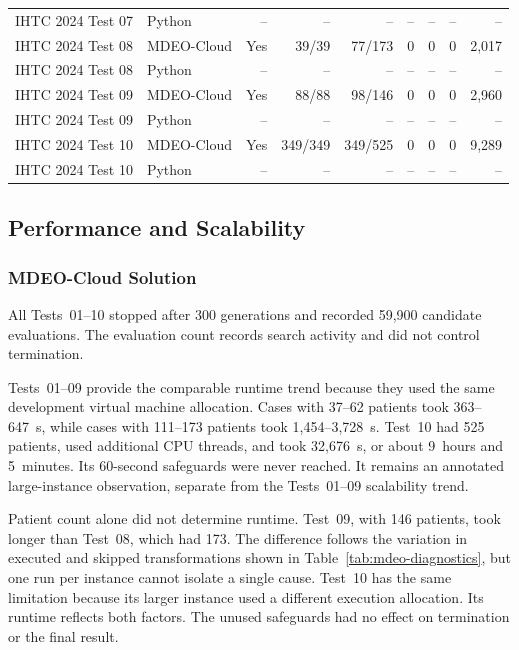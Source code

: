 \documentclass[11pt,a4paper]{article}
\begin{document}
\begin{landscape}
{\begin{longtable}{llrrrrrrr}
IHTC 2024 Test 07 & Python & -- & -- & -- & -- & -- & -- & -- \\
IHTC 2024 Test 08 & MDEO-Cloud & Yes & 39/39 & 77/173 & 0 & 0 & 0 & 2,017 \\
IHTC 2024 Test 08 & Python & -- & -- & -- & -- & -- & -- & -- \\
IHTC 2024 Test 09 & MDEO-Cloud & Yes & 88/88 & 98/146 & 0 & 0 & 0 & 2,960 \\
IHTC 2024 Test 09 & Python & -- & -- & -- & -- & -- & -- & -- \\
IHTC 2024 Test 10 & MDEO-Cloud & Yes & 349/349 & 349/525 & 0 & 0 & 0 & 9,289 \\
IHTC 2024 Test 10 & Python & -- & -- & -- & -- & -- & -- & -- \\
\bottomrule
\end{longtable}
}
\end{landscape}

\subsection{Performance and Scalability}

\subsubsection{MDEO-Cloud Solution}

All Tests~01--10 stopped after 300 generations and recorded 59,900 candidate evaluations. The evaluation count records search activity and did not control termination.

Tests~01--09 provide the comparable runtime trend because they used the same development virtual machine allocation. Cases with 37--62 patients took 363--647~s, while cases with 111--173 patients took 1,454--3,728~s. Test~10 had 525 patients, used additional CPU threads, and took 32,676~s, or about 9~hours and 5~minutes. Its 60-second safeguards were never reached. It remains an annotated large-instance observation, separate from the Tests~01--09 scalability trend.

Patient count alone did not determine runtime. Test~09, with 146 patients, took longer than Test~08, which had 173. The difference follows the variation in executed and skipped transformations shown in Table~\ref{tab:mdeo-diagnostics}, but one run per instance cannot isolate a single cause. Test~10 has the same limitation because its larger instance used a different execution allocation. Its runtime reflects both factors. The unused safeguards had no effect on termination or the final result.
\end{document}

